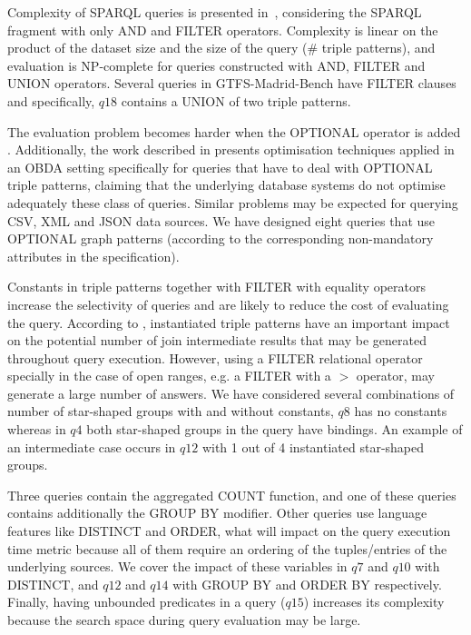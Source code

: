Complexity of SPARQL queries is presented in~\citep{perez2009semantics}, considering the SPARQL fragment with only AND and FILTER operators. Complexity is linear on the product of the dataset size and the size of the query (\# triple patterns), and evaluation is NP-complete for queries constructed with AND, FILTER and UNION operators. Several queries in GTFS-Madrid-Bench have FILTER clauses and specifically, $q18$ contains a UNION of two triple patterns.

The evaluation problem becomes harder when the OPTIONAL operator is added \citep{perez2009semantics}. Additionally, the work described in \citep{xiao2018efficient} presents optimisation techniques applied in an OBDA setting specifically for queries that have to deal with OPTIONAL triple patterns, claiming that the underlying database systems do not optimise adequately these class of queries. Similar problems may be expected for querying CSV, XML and JSON data sources. We have designed eight queries that use OPTIONAL graph patterns (according to the corresponding non-mandatory attributes in the specification). 

Constants in triple patterns together with FILTER with equality operators increase the selectivity of queries and are likely to reduce the cost of evaluating the query. According to \citep{montoya2012benchmarking}, instantiated triple patterns have an important impact on the potential number of join intermediate results that may be generated throughout query execution. However, using a FILTER relational operator specially in the case of open ranges, e.g. a FILTER with a $>$ operator, may generate a large number of answers. We have considered several combinations of number of star-shaped groups with and without constants, $q8$ has no constants whereas in $q4$ both star-shaped groups in the query have bindings. An example of an intermediate case occurs in $q12$ with 1 out of 4 instantiated star-shaped groups. 

Three queries contain the aggregated COUNT function, and one of these queries contains additionally the GROUP BY modifier. Other queries use language features like DISTINCT and ORDER, what will impact on the query execution time metric because all of them require an ordering of the tuples/entries of the underlying sources. We cover the impact of these variables in $q7$ and $q10$ with DISTINCT, and $q12$ and $q14$ with GROUP BY and ORDER BY respectively.%
Finally, having unbounded predicates in a query ($q15$) increases its complexity because the search space during query evaluation may be large. 

